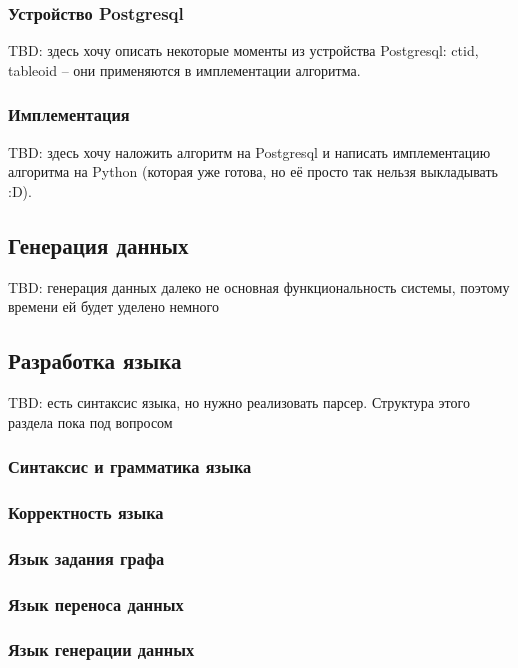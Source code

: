 \subsubsection{Устройство Postgresql}
TBD: здесь хочу описать некоторые моменты из устройства Postgresql: ctid, tableoid -- они применяются в имплементации алгоритма.

\subsubsection{Имплементация}
TBD: здесь хочу наложить алгоритм на Postgresql и написать имплементацию алгоритма на Python (которая уже готова, но её просто так нельзя выкладывать :D).

\subsection{Генерация данных}
TBD: генерация данных далеко не основная функциональность системы, поэтому времени ей будет уделено немного

\subsection{Разработка языка}
TBD: есть синтаксис языка, но нужно реализовать парсер. Структура этого раздела пока под вопросом

\subsubsection{Синтаксис и грамматика языка}

\subsubsection{Корректность языка}

\subsubsection{Язык задания графа}

\subsubsection{Язык переноса данных}

\subsubsection{Язык генерации данных}
